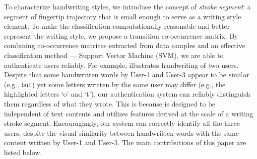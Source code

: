  
To characterize handwriting styles, we introduce the concept of \textit{stroke segment}: a segment of fingertip trajectory that is small enough to serve as a writing style element.
To make the classification computationally reasonable and better represent the writing style, we propose a transition co-occurrence matrix. %
 By combining co-occurrence matrices extracted from data samples and an effective classification method --- Support Vector Machine (SVM), we are able to authenticate users reliably.  For example,   illustrates handwriting of two users. Despite that some handwritten words by User-1 and User-3 appear to be similar (e.g., \texttt{but}) yet some letters written by the same user may differ (e.g., the highlighted letters `o' and `t'), our authentication system can reliably distinguish them regardless of what they wrote. This is because \CiT is designed to be independent of text contents and utilizes features derived at the scale of a writing stroke segment.
Encouragingly, our system can correctly identify all the three users, despite the visual similarity between handwritten words with the same content written by User-1 and User-3. %
%
%
The main contributions of this paper are listed below. 

